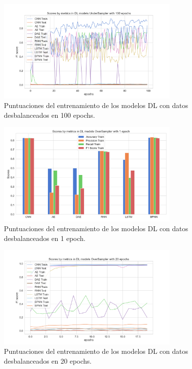 \begin{figure}[h!]
	\centering
	\includegraphics[width=0.8\textwidth]{"figuras/Experimento5/UnderSampler/DL_UnderSampler_100_train"}
	\caption{Puntuaciones del entrenamiento de los modelos DL con datos desbalanceados en 100 epochs.}
	\label{an:14}
\end{figure}

\begin{figure}[h!]
	\centering
	\includegraphics[width=0.8\textwidth]{"figuras/Experimento5/OverSampler/DL_OverSampler_1_train"}
	\caption{Puntuaciones del entrenamiento de los modelos DL con datos desbalanceados en 1 epoch.}
	\label{an:15}
\end{figure}

\begin{figure}[h!]
	\centering
	\includegraphics[width=0.8\textwidth]{"figuras/Experimento5/OverSampler/DL_OverSampler_20_train"}
	\caption{Puntuaciones del entrenamiento de los modelos DL con datos desbalanceados en 20 epochs.}
	\label{an:16}
\end{figure}

